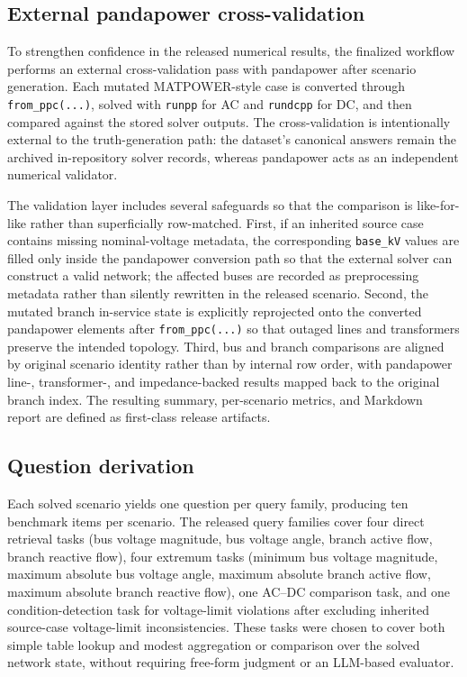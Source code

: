 \subsection*{External pandapower cross-validation}

To strengthen confidence in the released numerical results, the finalized workflow performs an external cross-validation pass with pandapower after scenario generation. Each mutated MATPOWER-style case is converted through \texttt{from\_ppc(...)}, solved with \texttt{runpp} for AC and \texttt{rundcpp} for DC, and then compared against the stored solver outputs. The cross-validation is intentionally external to the truth-generation path: the dataset's canonical answers remain the archived in-repository solver records, whereas pandapower acts as an independent numerical validator.

The validation layer includes several safeguards so that the comparison is like-for-like rather than superficially row-matched. First, if an inherited source case contains missing nominal-voltage metadata, the corresponding \texttt{base\_kV} values are filled only inside the pandapower conversion path so that the external solver can construct a valid network; the affected buses are recorded as preprocessing metadata rather than silently rewritten in the released scenario. Second, the mutated branch in-service state is explicitly reprojected onto the converted pandapower elements after \texttt{from\_ppc(...)} so that outaged lines and transformers preserve the intended topology. Third, bus and branch comparisons are aligned by original scenario identity rather than by internal row order, with pandapower line-, transformer-, and impedance-backed results mapped back to the original branch index. The resulting summary, per-scenario metrics, and Markdown report are defined as first-class release artifacts.

\subsection*{Question derivation}

Each solved scenario yields one question per query family, producing ten benchmark items per scenario. The released query families cover four direct retrieval tasks (bus voltage magnitude, bus voltage angle, branch active flow, branch reactive flow), four extremum tasks (minimum bus voltage magnitude, maximum absolute bus voltage angle, maximum absolute branch active flow, maximum absolute branch reactive flow), one AC--DC comparison task, and one condition-detection task for voltage-limit violations after excluding inherited source-case voltage-limit inconsistencies. These tasks were chosen to cover both simple table lookup and modest aggregation or comparison over the solved network state, without requiring free-form judgment or an LLM-based evaluator.

